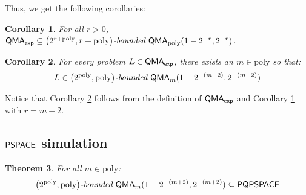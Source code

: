 \documentclass[11pt]{article}
\newtheorem{theorem}{Theorem}
\newtheorem{corollary}[theorem]{Corollary}
\theoremstyle{definition}
\theoremstyle{remark}
\newcommand\QMA{{\sf{QMA}}}
\newcommand\PSPACE{{\sf{PSPACE}}}
\newcommand\QMAexp{{\sf{QMA}_{exp}}}
\newcommand\bddQMA[5]{{\left(#1,#2\right)}\textit{-bounded }\QMA_{#3}(#4,#5)}
\newcommand\PQPSPACE{{\sf{PQPSPACE}}}
\newcommand{\poly}{\mathrm{poly}}
\begin{document}
Thus, we get the following corollaries:
\begin{corollary}\label{obvious1}For all $r>0$,
$\QMAexp\subseteq\bddQMA{2^{r+\poly}}{r + \poly}{\poly}{1-2^{-r}}{2^{-r}}$.
\end{corollary}

\begin{corollary}\label{obvious2}For every problem $L\in\QMAexp$, there exists an $m \in \poly$ so that:
\[L\in\bddQMA{2^{\poly}}{\poly}{m}{1-2^{-(m+2)}}{2^{-(m+2)}}\]
\end{corollary}
Notice that Corollary \ref{obvious2} follows from the definition of $\QMAexp$ and Corollary \ref{obvious1} with $r=m+2$.
\subsection{$\PSPACE$ simulation}
\begin{theorem} \label{thm:pqpspace simulation}
For all $m\in\poly$:\[\bddQMA{2^{\poly}}{\poly}{m}{1-2^{-(m+2)}}{2^{-(m+2)}}\subseteq\PQPSPACE\]\end{theorem}
\end{document}

